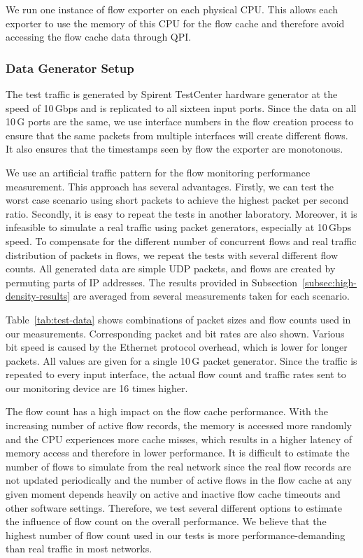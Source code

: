 We run one instance of flow exporter on each physical CPU. This allows each exporter to use the memory of this CPU for the flow cache and therefore avoid accessing the flow cache data through QPI.

\subsubsection{Data Generator Setup}

The test traffic is generated by Spirent TestCenter hardware generator at the speed of 10\,Gbps and is replicated to all sixteen input ports. Since the data on all 10\,G ports are the same, we use interface numbers in the flow creation process to ensure that the same packets from multiple interfaces will create different flows. It also ensures that the timestamps seen by flow the exporter are monotonous.

We use an artificial traffic pattern for the flow monitoring performance measurement. This approach has several advantages. Firstly, we can test the worst case scenario using short packets to achieve the highest packet per second ratio. Secondly, it is easy to repeat the tests in another laboratory. Moreover, it is infeasible to simulate a real traffic using packet generators, especially at 10\,Gbps speed. To compensate for the different number of concurrent flows and real traffic distribution of packets in flows, we repeat the tests with several different flow counts. All generated data are simple UDP packets, and flows are created by permuting parts of IP addresses. The results provided in Subsection~\ref{subsec:high-density-results} are averaged from several measurements taken for each scenario.

Table~\ref{tab:test-data} shows combinations of packet sizes and flow counts used in our measurements. Corresponding packet and bit rates are also shown. Various bit speed is caused by the Ethernet protocol overhead, which is lower for longer packets. All values are given for a single 10\,G packet generator. Since the traffic is repeated to every input interface, the actual flow count and traffic rates sent to our monitoring device are 16 times higher.

The flow count has a high impact on the flow cache performance. With the increasing number of active flow records, the memory is accessed more randomly and the CPU experiences more cache misses, which results in a higher latency of memory access and therefore in lower performance. It is difficult to estimate the number of flows to simulate from the real network since the real flow records are not updated periodically and the number of active flows in the flow cache at any given moment depends heavily on active and inactive flow cache timeouts and other software settings. Therefore, we test several different options to estimate the influence of flow count on the overall performance. We believe that the highest number of flow count used in our tests is more performance-demanding than real traffic in most networks.

